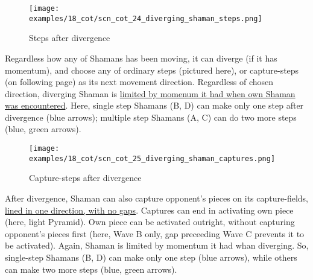 \vspace*{-2.1\baselineskip}
\noindent
\begin{figure}[!h]
\texttt{[image: examples/18\_cot/scn\_cot\_24\_diverging\_shaman\_steps.png]}
\vspace*{-1.3\baselineskip}
\caption{Steps after divergence}
\label{fig:scn_cot_24_diverging_shaman_steps}
\end{figure}

\vspace*{-0.5\baselineskip}
Regardless how any of Shamans has been moving, it can diverge (if it has momentum),
and choose any of ordinary steps (pictured here), or capture-steps (on following page)
as its next movement direction. Regardless of chosen direction, diverging Shaman is
\hyperref[fig:scn_cot_10_own_shaman_is_divergent_end]{limited by momenum it had when own Shaman was encountered}. \newline
\indent
Here, single step Shamans (B, D) can make only one step after divergence (blue arrows);
multiple step Shamans (A, C) can do two more steps (blue, green arrows).

\clearpage %

\vspace*{-2.7\baselineskip}
\noindent
\begin{figure}[!h]
\texttt{[image: examples/18\_cot/scn\_cot\_25\_diverging\_shaman\_captures.png]}
\vspace*{-1.4\baselineskip}
\caption{Capture-steps after divergence}
\label{fig:scn_cot_25_diverging_shaman_captures}
\end{figure}

\vspace*{-0.6\baselineskip}
After divergence, Shaman can also capture opponent's pieces on its capture-fields,
\hyperref[fig:scn_cot_03_light_shaman_capture_ply]{lined in one direction, with no gaps}.
Captures can end in activating own piece (here, light Pyramid). Own piece can
be activated outright, without capturing opponent's pieces first (here, Wave B only, gap
preceeding Wave C prevents it to be activated). \newline
\indent
Again, Shaman is limited by momentum it had whan diverging. So, single-step Shamans
(B, D) can make only one step (blue arrows), while others can make two more steps
(blue, green arrows).

\clearpage %

